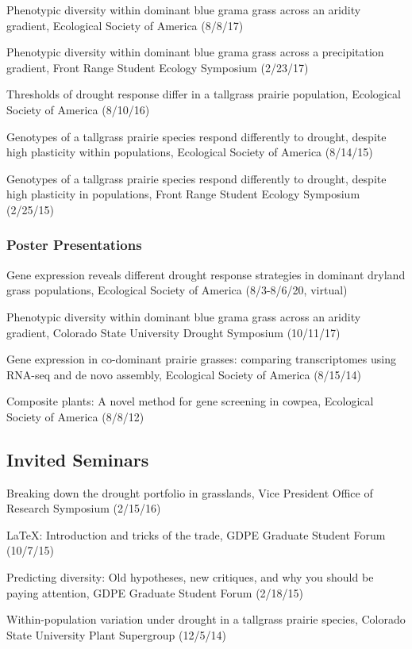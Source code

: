 \documentclass{cv}
\begin{document}
Phenotypic diversity within dominant blue grama grass across an aridity gradient, Ecological Society of America (8/8/17)

Phenotypic diversity within dominant blue grama grass across a precipitation gradient, Front Range Student Ecology Symposium (2/23/17)

Thresholds of drought response differ in a tallgrass prairie population, Ecological Society of America (8/10/16)

Genotypes of a tallgrass prairie species respond differently to drought, despite high plasticity within populations, Ecological Society of America (8/14/15)

Genotypes of a tallgrass prairie species respond differently to drought, despite high plasticity in populations, Front Range Student Ecology Symposium (2/25/15)

\subsubsection*{Poster Presentations}

Gene expression reveals different drought response strategies in dominant dryland grass populations, Ecological Society of America (8/3-8/6/20, virtual)

Phenotypic diversity within dominant blue grama grass across an aridity gradient, Colorado State University Drought Symposium (10/11/17)

Gene expression in co-dominant prairie grasses: comparing transcriptomes using RNA-seq and de novo assembly, Ecological Society of America (8/15/14)

Composite plants: A novel method for gene screening in cowpea, Ecological Society of America (8/8/12)

\subsection*{Invited Seminars}

Breaking down the drought portfolio in grasslands, Vice President Office of Research Symposium (2/15/16)

\LaTeX: Introduction and tricks of the trade, GDPE Graduate Student Forum (10/7/15)

Predicting diversity: Old hypotheses, new critiques, and why you should be paying attention, GDPE Graduate Student Forum (2/18/15)

Within-population variation under drought in a tallgrass prairie species, Colorado State University Plant Supergroup (12/5/14)
\end{document}
